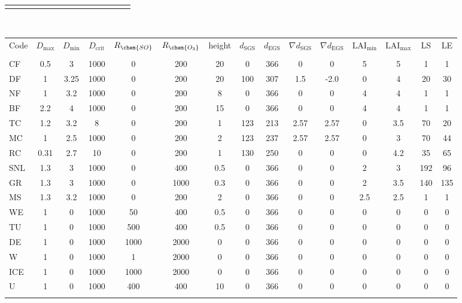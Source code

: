 \documentclass[manuscript]{copernicus}
\begin{document}
\begin{sidewaystable}[!htbp]
\begin{tabular}{lcccccccccccccc}
    \bottomhline
  \end{tabular}
  \\
  \vspace{2\baselineskip}
  \begin{tabular}{lcccccccccccccc}
    \tophline
    Code & $D_\text{max}$ & $D_\text{min}$ & $D_\text{crit}$ & $R_\chem{SO}$ & $R_\chem{O_3}$ & height & $d_\text{SGS}$ & $d_\text{EGS}$ & $\nabla d_\text{SGS}$ & $\nabla d_\text{EGS}$ & $\text{LAI}_\text{min}$ & $\text{LAI}_\text{max}$ & LS & LE \\
    &&&&&&&&&&&&&& \\
    \middlehline
    CF & 0.5 & 3 & 1000 & 0 & 200 & 20 & 0 & 366 & 0 & 0 & 5 & 5 & 1 & 1\\
    DF & 1 & 3.25 & 1000 & 0 & 200 & 20 & 100 & 307 & 1.5 & -2.0 & 0 & 4 & 20 & 30\\
    NF & 1 & 3.2 & 1000 & 0 & 200 & 8 & 0 & 366 & 0 & 0 & 4 & 4 & 1 & 1\\
    BF & 2.2 & 4 & 1000 & 0 & 200 & 15 & 0 & 366 & 0 & 0 & 4 & 4 & 1 & 1\\
    TC & 1.2 & 3.2 & 8 & 0 & 200 & 1 & 123 & 213 & 2.57 & 2.57 & 0 & 3.5 & 70 & 20\\
    MC & 1 & 2.5 & 1000 & 0 & 200 & 2 & 123 & 237 & 2.57 & 2.57 & 0 & 3 & 70 & 44\\
    RC & 0.31 & 2.7 & 10 & 0 & 200 & 1 & 130 & 250 & 0 & 0 & 0 & 4.2 & 35 & 65\\
    SNL & 1.3 & 3 & 1000 & 0 & 400 & 0.5 & 0 & 366 & 0 & 0 & 2 & 3 & 192 & 96\\
    GR & 1.3 & 3 & 1000 & 0 & 1000 & 0.3 & 0 & 366 & 0 & 0 & 2 & 3.5 & 140 & 135\\
    MS & 1.3 & 3.2 & 1000 & 0 & 200 & 2 & 0 & 366 & 0 & 0 & 2.5 & 2.5 & 1 & 1\\
    WE  & 1 & 0 & 1000 & 50 & 400 & 0.5 & 0 & 366 & 0 & 0 & 0 & 0 & 0 & 0\\
    TU & 1 & 0 & 1000 & 500 & 400 & 0.5 & 0 & 366 & 0 & 0 & 0 & 0 & 0 & 0\\
    DE & 1 & 0 & 1000 & 1000 & 2000 & 0 & 0 & 366 & 0 & 0 & 0 & 0 & 0 & 0\\
    W  & 1 & 0 & 1000 & 1 & 2000 & 0 & 0 & 366 & 0 & 0 & 0 & 0 & 0 & 0\\
    ICE & 1 & 0 & 1000 & 1000 & 2000 & 0 & 0 & 366 & 0 & 0 & 0 & 0 & 0 & 0\\
    U & 1 & 0 & 1000 & 400 & 400 & 10 & 0 & 366 & 0 & 0 & 0 & 0 & 0 & 0\\
    \bottomhline
  \end{tabular}
\end{sidewaystable}
\end{document}
